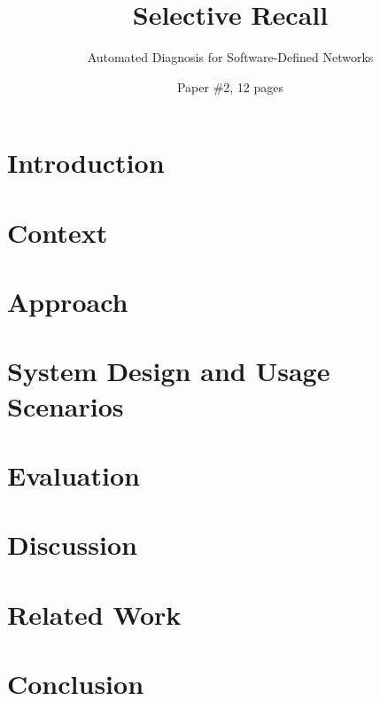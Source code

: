 \documentclass{sig-alternate-10pt}
\begin{document}
    \date{}

\title{Selective Recall}
\subtitle{Automated Diagnosis for Software-Defined Networks}
    \author{Paper \#2, 12 pages}
    \maketitle
   \thispagestyle{empty}

%

\abstract{{\it }}

\section{Introduction}
\label{sec:intro}


\section{Context}
\label{sec:overview}


\section{Approach}
\label{sec:approach}


\section{System Design and Usage Scenarios}
\label{sec:architecture}


\section{Evaluation}
\label{sec:evaluation}


\section{Discussion}
\label{sec:discussion}


\section{Related Work}
\label{sec:related_work}


\section{Conclusion}
\label{sec:conclusion}



 

%

\end{document}
